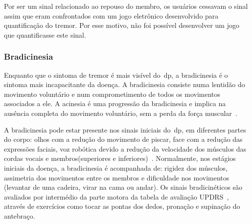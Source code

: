 Por ser um sinal relacionado ao repouso do membro, os usuários cessavam o sinal assim que eram confrontados com um jogo eletrônico desenvolvido para quantificação do tremor. Por esse motivo, não foi possível desenvolver um jogo que quantificasse este sinal.


\subsubsection{Bradicinesia}\label{section:analise_bradicinesia}
Enquanto que o sintoma de tremor é mais visível do~\ac{dp}, a bradicinesia é o sintoma mais incapacitante da doença. A bradicinesia consiste numa lentidão do movimento voluntário e num comprometimento de todos os movimentos associados a ele. A acinesia é uma progressão da bradicinesia e implica na ausência completa do movimento voluntário, sem a perda da força muscular~\cite{do2007parkinson}.

A bradicinesia pode estar presente nos sinais iniciais do~\ac{dp}, em diferentes partes do corpo: olhos com a redução do movimento de piscar, face com a redução das expressões faciais, voz robótica devido a redução da velocidade dos músculos das cordas vocais e membros(superiores e inferiores)~\cite{do2007parkinson}. Normalmente, nos estágios iniciais da doença, a bradicinesia é acompanhada de: rigidez dos músculos, assimetria dos movimentos entre os membros e dificuldade nos movimentos (levantar de uma cadeira, virar na cama ou andar). Os sinais bradicinéticos são avaliados por intermédio da parte motora da tabela de avaliação UPDRS~\cite{updrs87}, através de exercícios como tocar as pontas dos dedos, pronação e supinação do antebraço. 

